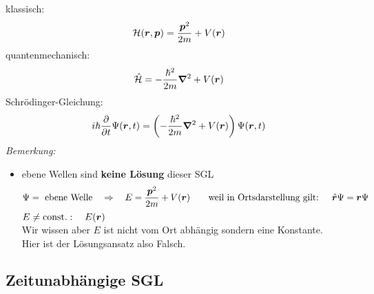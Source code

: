 klassisch:
\begin{equation*}
\mathcal{H}(\bm{r},\bm{p}) = \frac{\bm{p}^2}{2 m} + V(\bm{r})
\end{equation*}
quantenmechanisch:
\begin{equation*}
\hat{\mathcal{H}} = - \frac{\hbar^2}{2 m} \bm{\nabla}^2 + V(\bm{r})
\end{equation*}
Schrödinger-Gleichung:
\begin{equation*}
i \hbar \frac{\partial }{\partial t} \Psi(\bm{r},t) = \left(- \frac{\hbar^2}{2 m} \bm{\nabla}^2 + V(\bm{r})\right) \Psi(\bm{r},t)
\end{equation*}
\emph{Bemerkung:}
\begin{itemize}
	\item ebene Wellen sind \textbf{keine Lösung} dieser SGL
	\begin{equation*}
	\Psi = \textrm{ ebene Welle} \quad \Rightarrow \quad E = \frac{\bm{p}^2}{2 m} + V(\bm{r}) \qquad \textrm{weil in Ortsdarstellung gilt: } \quad \hat{\bm{r}} \Psi = \bm{r} \Psi 
	\end{equation*}
	\LARGE{\lightning} \normalsize $ E \neq \textrm{const.} : \quad E(\bm{r}) $\\
	Wir wissen aber $ E $ ist nicht vom Ort abhängig sondern eine Konstante.\\
	Hier ist der Lösungsansatz also Falsch. \LARGE{\lightning} \normalsize
\end{itemize}

\subsection{Zeitunabhängige SGL}

